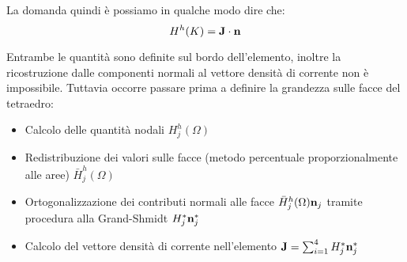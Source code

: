 La domanda quindi \`e possiamo in qualche modo dire che:
\begin{equation}
H^h(K) = \mathbf{J}\cdot \mathbf{n} 
\end{equation}

Entrambe le quantit\`a sono definite sul bordo dell'elemento, inoltre la ricostruzione dalle componenti normali al vettore densit\`a di corrente non \`e impossibile.
Tuttavia occorre passare prima a definire la grandezza sulle facce del tetraedro:
\begin{itemize}
\item Calcolo delle quantit\`a nodali $H^h_j(\Omega)$
\item Redistribuzione dei valori sulle facce (metodo percentuale proporzionalmente alle aree) $\bar{H}^h_j(\Omega)$
\item Ortogonalizzazione dei contributi normali alle facce $\bar{H}^h_j(\Omega) \mathbf{n}_j$ tramite procedura alla Grand-Shmidt $H^*_j \mathbf{n}_j^*$
\item Calcolo del vettore densit\`a di corrente nell'elemento $\mathbf{J}=\sum_{i=1}^4 H^*_j\mathbf{n}_j^*$
\end{itemize}

